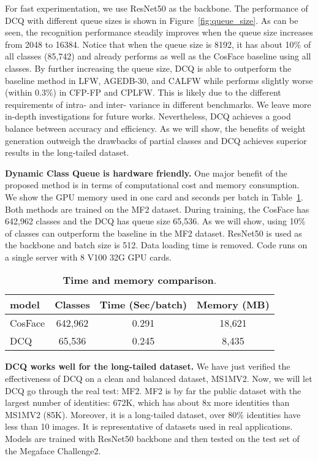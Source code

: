 \documentclass[10pt,twocolumn,letterpaper]{article}
\begin{document}
For fast experimentation, we use ResNet50 as the backbone. The performance of DCQ with different queue sizes is shown in Figure~\ref{fig:queue_size}. As can be seen, the recognition performance steadily improves when the queue size increases from 2048 to 16384. Notice that when the queue size is 8192, it has about 10\% of all classes (85,742) and already performs as well as the CosFace baseline using all classes. By further increasing the queue size, DCQ is able to outperform the baseline method in LFW, AGEDB-30, and CALFW while performs slightly worse (within 0.3\%) in CFP-FP and CPLFW. This is likely due to the different requirements of intra- and inter- variance in different benchmarks. We leave more in-depth investigations for future works. Nevertheless, DCQ achieves a good balance between accuracy and efficiency. As we will show, the benefits of weight generation outweigh the drawbacks of partial classes and DCQ achieves superior results in the long-tailed dataset.

\textbf{Dynamic Class Queue is hardware friendly.}
One major benefit of the proposed method is in terms of computational cost and memory consumption. We show the GPU memory used in one card and seconds per batch in Table~\ref{tab:memory_compute}. Both methods are trained on the MF2 dataset. During training, the CosFace has 642,962 classes and the DCQ has queue size 65,536. As we will show, using 10\% of classes can outperform the baseline in the MF2 dataset. ResNet50 is used as the backbone and batch size is 512. Data loading time is removed. Code runs on a single server with 8 V100 32G GPU cards. 

\begin{table}[h]
   \centering
   \footnotesize
   \caption{\textbf{Time and memory comparison}. \label{tab:memory_compute}}
   \begin{tabular}{| l | c c c|}
      \hline
      model & Classes & Time (Sec/batch) & Memory (MB) \\
      \hline\hline
      CosFace & 642,962 & 0.291 & 18,621\\
      DCQ & 65,536 & 0.245 & 8,435\\
      \hline
   \end{tabular}
\end{table}

\textbf{DCQ works well for the long-tailed dataset.} We have just verified the effectiveness of DCQ on a clean and balanced dataset, MS1MV2. Now, we will let DCQ go through the real test: MF2. MF2 is by far the public dataset with the largest number of identities: 672K, which has about 8x more identities than MS1MV2 (85K). Moreover, it is a long-tailed dataset, over 80\% identities have less than 10 images. It is representative of datasets used in real applications. Models are trained with ResNet50 backbone and then tested on the test set of the Megaface Challenge2.
\end{document}
